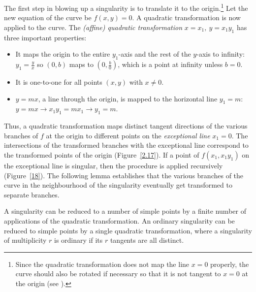 The first step in blowing up a singularity is to translate it to the 
origin.\footnote{Since the quadratic transformation does not map the line $x=0$ 
	properly, the curve should also be rotated if necessary so that it is 
	not tangent to $x=0$ at the origin (see \cite{jj}).}
Let the new equation of the curve be $f(x,y)=0$.
A quadratic transformation is now applied to the curve.
The {\em (affine) quadratic transformation} $x = x_{1},\ y = x_{1}y_{1}$
\cite{abhy} has three important properties:
\begin{itemize}
\item
It maps the origin to the entire $y_{1}$-axis and the rest of 
the $y$-axis to infinity: $y_{1} = \frac{y}{x}$ so $(0,b)$ maps to 
$(0,\frac{b}{0})$, which is a point at infinity unless $b=0$.
\item
It is one-to-one for all points $(x,y)$ with $x \neq 0$.
\item
$y = mx$, a line  through the origin, is mapped to the horizontal line $y_{1}=m$:\\
$y=mx \rightarrow  x_{1}y_{1} = mx_{1}  \rightarrow  y_{1}=m$.
\end{itemize}
Thus, a quadratic transformation maps distinct tangent directions of the
various branches of $f$ at the origin to different points on the 
{\em exceptional line} $x_{1} =0$.
The intersections of the transformed branches with the exceptional line
correspond to the transformed points of the origin (Figure~\ref{2.17}).
If a point of $f(x_{1},x_{1}y_{1})$ on the exceptional line is singular, 
then the procedure is applied recursively (Figure~\ref{18}).
The following lemma establishes that the various branches of the curve 
in the neighbourhood of the singularity eventually get transformed to separate 
branches.

\begin{lemma}
A singularity can be reduced to a number of simple points by 
a finite number of applications of the quadratic transformation.
An ordinary singularity can be reduced to simple points by a 
single quadratic transformation, where a singularity of multiplicity 
$r$ is ordinary if its $r$ tangents are all distinct.
\end{lemma}

